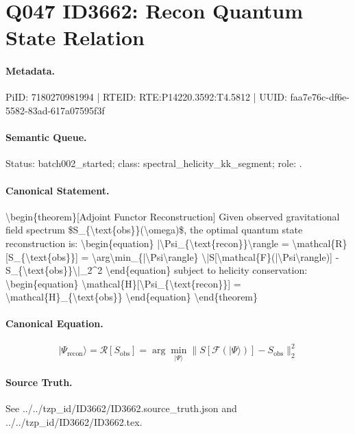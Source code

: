 \section*{Q047 ID3662: Recon Quantum State Relation}
\paragraph{Metadata.}
PiID: 7180270981994 | RTEID: RTE:P14220.3592:T4.5812 | UUID: faa7e76c-df6e-5582-83ad-617a07595f3f

\paragraph{Semantic Queue.}
Status: batch002\_started; class: spectral\_helicity\_kk\_segment; role: .

\paragraph{Canonical Statement.}
\textbackslash{}begin\{theorem\}[Adjoint Functor Reconstruction] Given observed gravitational field spectrum \$S\_\{\textbackslash{}text\{obs\}\}(\textbackslash{}omega)\$, the optimal quantum state reconstruction is: \textbackslash{}begin\{equation\} |\textbackslash{}Psi\_\{\textbackslash{}text\{recon\}\}\textbackslash{}rangle = \textbackslash{}mathcal\{R\}[S\_\{\textbackslash{}text\{obs\}\}] = \textbackslash{}arg\textbackslash{}min\_\{|\textbackslash{}Psi\textbackslash{}rangle\} \textbackslash{}|S[\textbackslash{}mathcal\{F\}(|\textbackslash{}Psi\textbackslash{}rangle)] - S\_\{\textbackslash{}text\{obs\}\}\textbackslash{}|\_2\textasciicircum{}2 \textbackslash{}end\{equation\} subject to helicity conservation: \textbackslash{}begin\{equation\} \textbackslash{}mathcal\{H\}[\textbackslash{}Psi\_\{\textbackslash{}text\{recon\}\}] = \textbackslash{}mathcal\{H\}\_\{\textbackslash{}text\{obs\}\} \textbackslash{}end\{equation\} \textbackslash{}end\{theorem\}

\paragraph{Canonical Equation.}
\[
\begin{equation} |\Psi_{\text{recon}}\rangle = \mathcal{R}[S_{\text{obs}}] = \arg\min_{|\Psi\rangle} \|S[\mathcal{F}(|\Psi\rangle)] - S_{\text{obs}}\|_2^2 \end{equation}
\]

\paragraph{Source Truth.}
See ../../tzp\_id/ID3662/ID3662.source\_truth.json and ../../tzp\_id/ID3662/ID3662.tex.
